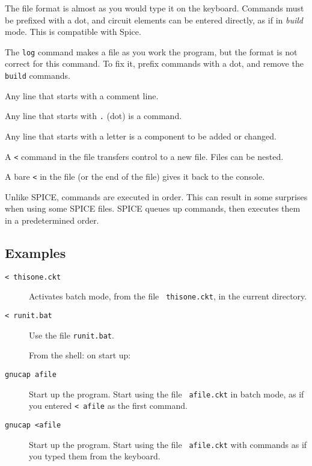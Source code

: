 The file format is almost as you would type it on the keyboard.  Commands
must be prefixed with a dot, and circuit elements can be entered directly,
as if in {\em build} mode.  This is compatible with Spice.  

The {\tt log} command makes a file as you work the program, but the
format is not correct for this command.  To fix it, prefix commands
with a dot, and remove the {\tt build} commands.

Any line that starts with {\tt *} a comment line.

Any line that starts with {\tt .} (dot) is a command.

Any line that starts with a letter is a component to be added or changed.

A {\tt <} command in the file transfers control to a new file.  Files can be
nested.

A bare {\tt <} in the file (or the end of the file) gives it back to the
console.

Unlike SPICE, commands are executed in order.  This can result in some
surprises when using some SPICE files.  SPICE queues up commands, then
executes them in a predetermined order.
\subsection{Examples}

\begin{description}

\item[{\tt < thisone.ckt}] Activates batch mode, from the file {\tt
thisone.ckt}, in the current directory.

\item[{\tt < runit.bat}] Use the file {\tt runit.bat}.


From the shell: on start up:

\item[{\tt gnucap afile}] Start up the program.  Start using the file {\tt
afile.ckt} in batch mode, as if you entered {\tt < afile} as the first
command.

\item[{\tt gnucap <afile}] Start up the program.  Start using the file {\tt
afile.ckt} with commands as if you typed them from the keyboard.

\end{description}
